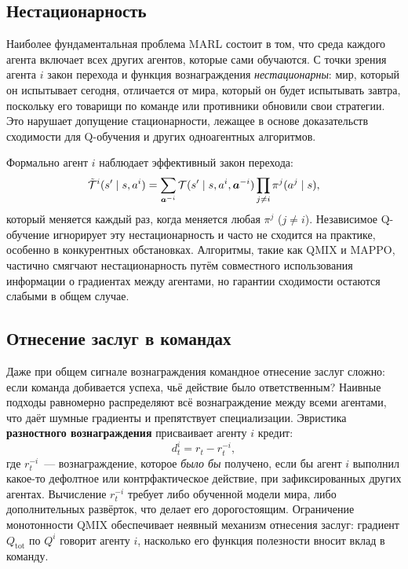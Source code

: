 \subsection{Нестационарность}

Наиболее фундаментальная проблема MARL состоит в том, что среда каждого агента
включает всех других агентов, которые сами
обучаются. С точки зрения агента $i$ закон перехода и
функция вознаграждения \emph{нестационарны}:
мир, который он испытывает сегодня, отличается от мира, который он будет
испытывать завтра, поскольку его товарищи по команде или противники обновили
свои стратегии. Это нарушает допущение стационарности, лежащее в основе
доказательств сходимости для Q-обучения и других одноагентных
алгоритмов.

Формально агент $i$ наблюдает эффективный закон перехода:
\[
  \tilde{\mathcal{T}}^i(s' \mid s, a^i)
  = \sum_{\bm{a}^{-i}} \mathcal{T}(s' \mid s, a^i, \bm{a}^{-i})
    \prod_{j \neq i} \pi^j(a^j \mid s),
\]
который меняется каждый раз, когда меняется любая $\pi^j$ ($j \neq i$). Независимое
Q-обучение игнорирует эту нестационарность
и часто не сходится на практике, особенно в конкурентных
обстановках. Алгоритмы, такие как QMIX и MAPPO, частично смягчают
нестационарность путём совместного использования информации о градиентах между агентами, но
гарантии сходимости остаются слабыми в общем случае.

\subsection{Отнесение заслуг в командах}

Даже при общем сигнале вознаграждения командное отнесение заслуг
сложно: если команда добивается успеха, чьё
действие было ответственным? Наивные подходы равномерно распределяют всё вознаграждение
между всеми агентами, что даёт шумные градиенты и препятствует
специализации. Эвристика \textbf{разностного вознаграждения}
присваивает агенту $i$ кредит:
\[
  d^i_t = r_t - r_t^{-i},
\]
где $r_t^{-i}$~--- вознаграждение, которое \emph{было бы} получено,
если бы агент $i$ выполнил какое-то дефолтное или контрфактическое действие,
при зафиксированных других агентах. Вычисление $r_t^{-i}$ требует либо
обученной модели мира, либо дополнительных развёрток, что делает его дорогостоящим.
Ограничение монотонности QMIX обеспечивает неявный механизм отнесения заслуг:
градиент $Q_\mathrm{tot}$ по $Q^i$
говорит агенту $i$, насколько его функция полезности вносит вклад в команду.

